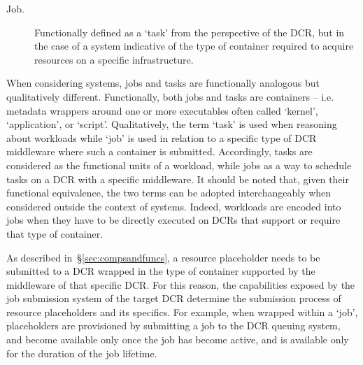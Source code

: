 \documentclass{sig-alternate}
\begin{document}
\begin{description}

\item[Job.] Functionally defined as a `task' from the perspective of the DCR,
but in the case of a \pilotjob system indicative of the type of container
required to acquire resources on a specific infrastructure.

\end{description}

When considering \pilotjob systems, jobs and tasks are functionally analogous
but qualitatively different. Functionally, both jobs and tasks are containers --
i.e. metadata wrappers around one or more executables often called `kernel',
`application', or `script'. Qualitatively, the term `task' is used when
reasoning about workloads while `job' is used in relation to a specific type of
DCR middleware where such a container is submitted.  Accordingly, tasks are considered as the functional units of a
workload, while jobs as a way to schedule tasks on a DCR with a specific
middleware.    It should be noted that, given their
functional equivalence, the two terms can be adopted interchangeably when
considered outside the context of \pilotjob systems. Indeed, workloads are
encoded into jobs when they have to be directly executed on DCRs that support or
require that type of container.

 

As described in~\S\ref{sec:compsandfuncs}, a resource placeholder needs to be
submitted to a DCR wrapped in the type of container supported by the middleware
of that specific DCR. For this reason, the capabilities exposed by the job
submission system of the target DCR determine the submission process of resource
placeholders and its specifics.
For example, when wrapped within a `job', placeholders are provisioned by
submitting a job to the DCR queuing system, and become available only once the
job has become active, and is available only for the duration of the job
lifetime. 
\end{document}
